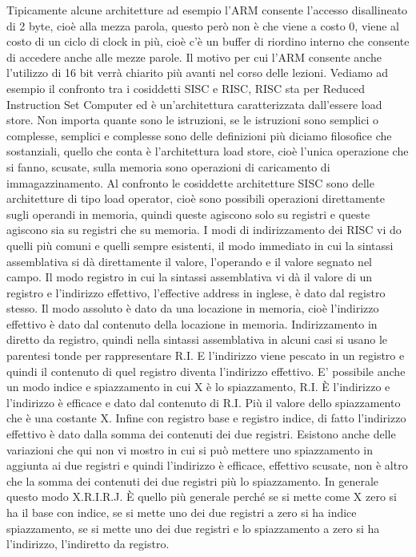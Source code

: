 Tipicamente alcune architetture ad esempio l'ARM consente l'accesso disallineato di 2 byte, cioè alla mezza parola, questo però non è che viene a costo 0, viene al costo di un ciclo di clock in più, cioè c'è un buffer di riordino interno che consente di accedere anche alle mezze parole.
Il motivo per cui l'ARM consente anche l'utilizzo di 16 bit verrà chiarito più avanti nel corso delle lezioni.
Vediamo ad esempio il confronto tra i cosiddetti SISC e RISC, RISC sta per Reduced Instruction Set Computer ed è un'architettura caratterizzata dall'essere load store.
Non importa quante sono le istruzioni, se le istruzioni sono semplici o complesse, semplici e complesse sono delle definizioni più diciamo filosofice che sostanziali, quello che conta è l'architettura load store, cioè l'unica operazione che si fanno, scusate, sulla memoria sono operazioni di caricamento di immagazzinamento.
Al confronto le cosiddette architetture SISC sono delle architetture di tipo load operator, cioè sono possibili operazioni direttamente sugli operandi in memoria, quindi queste agiscono solo su registri e queste agiscono sia su registri che su memoria.
I modi di indirizzamento dei RISC vi do quelli più comuni e quelli sempre esistenti, il modo immediato in cui la sintassi assemblativa si dà direttamente il valore, l'operando e il valore segnato nel campo.
Il modo registro in cui la sintassi assemblativa vi dà il valore di un registro e l'indirizzo effettivo, l'effective address in inglese, è dato dal registro stesso.
Il modo assoluto è dato da una locazione in memoria, cioè l'indirizzo effettivo è dato dal contenuto della locazione in memoria.
Indirizzamento in diretto da registro, quindi nella sintassi assemblativa in alcuni casi si usano le parentesi tonde per rappresentare R.I.
E l'indirizzo viene pescato in un registro e quindi il contenuto di quel registro diventa l'indirizzo effettivo.
E' possibile anche un modo indice e spiazzamento in cui X è lo spiazzamento, R.I.
È l'indirizzo e l'indirizzo è efficace e dato dal contenuto di R.I.
Più il valore dello spiazzamento che è una costante X.
Infine con registro base e registro indice, di fatto l'indirizzo effettivo è dato dalla somma dei contenuti dei due registri.
Esistono anche delle variazioni che qui non vi mostro in cui si può mettere uno spiazzamento in aggiunta ai due registri e quindi l'indirizzo è efficace, effettivo scusate, non è altro che la somma dei contenuti dei due registri più lo spiazzamento.
In generale questo modo X.R.I.R.J.
È quello più generale perché se si mette come X zero si ha il base con indice, se si mette uno dei due registri a zero si ha indice spiazzamento, se si mette uno dei due registri e lo spiazzamento a zero si ha l'indirizzo, l'indiretto da registro.

